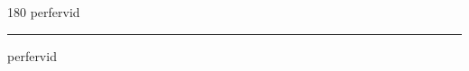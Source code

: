 
\begin{frame}
\begin{center}
\begin{turn}{180}
{\fontsize{2.5cm}{1em}\selectfont perfervid}
\end{turn}
\vspace{1em}\par  
\hrule
\vspace{1em}\par  
{\fontsize{2.5cm}{1em}\selectfont perfervid}
\end{center}
\end{frame}
